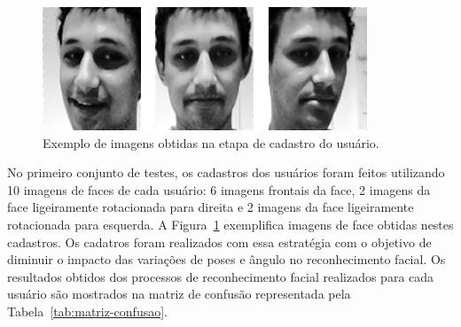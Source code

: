 
		\begin{figure}[htb]
			\begin{center}
				\includegraphics[scale=0.4]{figuras/4.ProblemaEProposta/face-registro.png}
			\end{center}
			\caption{Exemplo de imagens obtidas na etapa de cadastro do usuário.}
			\label{fig:imgs-cadastro}
		\end{figure}	

	No primeiro conjunto de testes, os cadastros dos usuários foram feitos utilizando 10 imagens de faces de cada usuário: 6 imagens frontais da face, 2 imagens da face ligeiramente rotacionada para direita e 2 imagens da face ligeiramente rotacionada para esquerda. A Figura~\ref{fig:imgs-cadastro} exemplifica imagens de face obtidas nestes cadastros. Os cadatros foram realizados com essa estratégia com o objetivo de diminuir o impacto das variações de poses e ângulo no reconhecimento facial. Os resultados obtidos dos processos de reconhecimento facial realizados para cada usuário são mostrados na matriz de confusão representada pela Tabela~\ref{tab:matriz-confusao}. 

